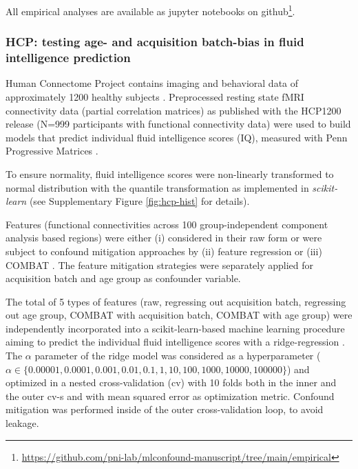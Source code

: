 \documentclass{article}
\begin{document}
All empirical analyses are available as jupyter notebooks on github\footnote{\href{https://github.com/pni-lab/mlconfound-manuscript/tree/main/empirical}{https://github.com/pni-lab/mlconfound-manuscript/tree/main/empirical}}.

\subsubsection*{HCP: testing age- and acquisition batch-bias in fluid intelligence prediction}

Human Connectome Project contains imaging and behavioral data of approximately 1200 healthy subjects \citep{van2013wu}. Preprocessed resting state fMRI connectivity data (partial correlation matrices) \citep{glasser2013minimal} as published with the HCP1200 release (N=999 participants with functional connectivity data) were used to build models that predict individual fluid intelligence scores (IQ), measured with Penn Progressive Matrices \citep{duncan2000neural}.

To ensure normality, fluid intelligence scores were non-linearly transformed to normal distribution with the quantile transformation \citep{beasley2009rank} as implemented in \emph{scikit-learn} \citep{pedregosa2011scikit} (see Supplementary Figure \ref{fig:hcp-hist} for details).

Features (functional connectivities across 100 group-independent component analysis based regions) were either (i) considered in their raw form or were subject to confound mitigation approaches by (ii) feature regression \citep{rao2017predictive} or (iii) COMBAT \citep{johnson2007adjusting, fortin2018harmonization}.
The feature mitigation strategies were separately applied for acquisition batch and age group as confounder variable.

The total of 5 types of features (raw, regressing out acquisition batch, regressing out age group, COMBAT with acquisition batch, COMBAT with age group) were independently incorporated into a scikit-learn-based \citep{pedregosa2011scikit} machine learning procedure aiming to predict the individual fluid intelligence scores with a ridge-regression \citep{hoerl1970ridge}. The $\alpha$ parameter of the ridge model was considered as a hyperparameter ($\alpha \in \{0.00001, 0.0001, 0.001, 0.01, 0.1, 1, 10, 100, 1000, 10000, 100000\}$) and optimized in a nested cross-validation (cv) with 10 folds both in the inner and the outer cv-s and with mean squared error as optimization metric. Confound mitigation was performed inside of the outer cross-validation loop, to avoid leakage.
\end{document}
